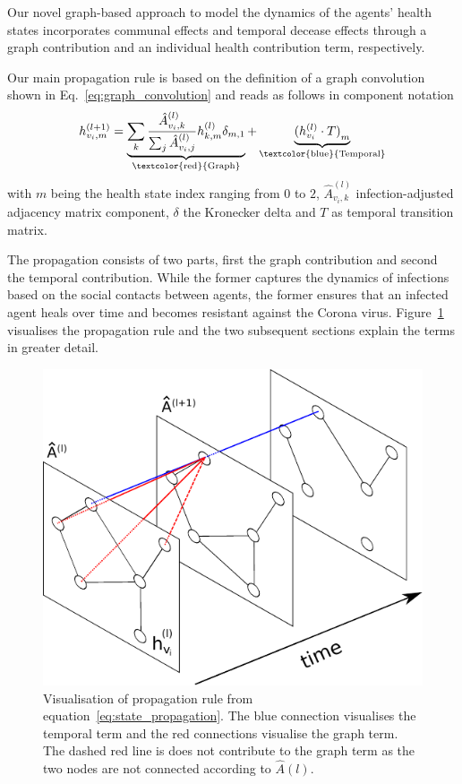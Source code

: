 
Our novel graph-based approach to model the dynamics of the agents' health states incorporates communal effects and temporal decease effects through a graph contribution and an individual health contribution term, respectively.

Our main propagation rule is based on the definition of a graph convolution shown in Eq.~\eqref{eq:graph_convolution} and reads as follows in component notation
\begin{equation}
	\label{eq:state_propagation}
	h_{v_i, m}^{(l+1)}
	=
	\underbrace{
		\sum_k \frac{\hat{A}_{v_i, k}^{(l)}}{\sum_j \hat{A}_{v_i, j}^{(l)}} h_{k, m}^{(l)} \delta_{m, 1}
	}_{\text{\textcolor{red}{Graph}}}
	+
	\underbrace{
		{(h_{v_i}^{(l)}\cdot T)}_m
	}_{\text{\textcolor{blue}{Temporal}}}
\end{equation}
with $m$ being the health state index ranging from $0$ to $2$, $\hat{A}_{v_i, k}^{(l)}$ infection-adjusted adjacency matrix component, $\delta$ the Kronecker delta and $T$ as temporal transition matrix.

The propagation consists of two parts, first the graph contribution and second the temporal contribution. While the former captures the dynamics of infections based on the social contacts between agents, the former ensures that an infected agent heals over time and becomes resistant against the Corona virus. Figure~\ref{fig:state_propagation} visualises the propagation rule and the two subsequent sections explain the terms in greater detail.

\begin{figure}[H]
	\centering
	\includegraphics[width=0.8\columnwidth]{img/state_propagation.pdf}
	\caption{Visualisation of propagation rule from equation~\eqref{eq:state_propagation}. The blue connection visualises the temporal term and the red connections visualise the graph term. The dashed red line is does not contribute to the graph term as the two nodes are not connected according to $\hat{A}(l)$.}%
	\label{fig:state_propagation}
\end{figure}


